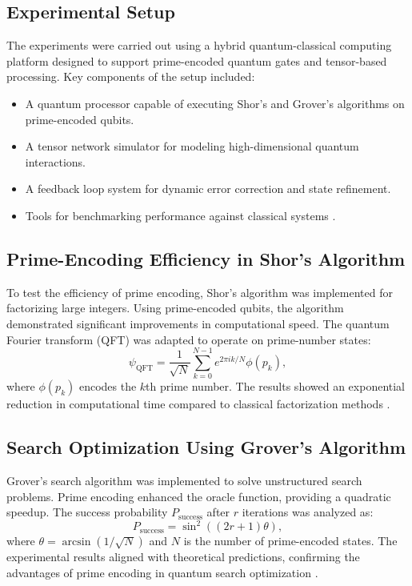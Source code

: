 \documentclass{article}
\theoremstyle{plain}
\begin{document}
\subsection{Experimental Setup}
The experiments were carried out using a hybrid quantum-classical computing platform designed to support prime-encoded quantum gates and tensor-based processing. Key components of the setup included:
\begin{itemize}
    \item A quantum processor capable of executing Shor’s and Grover’s algorithms on prime-encoded qubits.
    \item A tensor network simulator for modeling high-dimensional quantum interactions.
    \item A feedback loop system for dynamic error correction and state refinement.
    \item Tools for benchmarking performance against classical systems \cite{preskill2018quantum, shor1999algorithms}.
\end{itemize}

\subsection{Prime-Encoding Efficiency in Shor’s Algorithm}
To test the efficiency of prime encoding, Shor’s algorithm was implemented for factorizing large integers. Using prime-encoded qubits, the algorithm demonstrated significant improvements in computational speed. The quantum Fourier transform (QFT) was adapted to operate on prime-number states:
\begin{equation}
\psi_{\text{QFT}} = \frac{1}{\sqrt{N}} \sum_{k=0}^{N-1} e^{2\pi i k/N} \phi(p_k),
\end{equation}
where $\phi(p_k)$ encodes the $k$th prime number. The results showed an exponential reduction in computational time compared to classical factorization methods \cite{shor1999algorithms}.

\subsection{Search Optimization Using Grover’s Algorithm}
Grover’s search algorithm was implemented to solve unstructured search problems. Prime encoding enhanced the oracle function, providing a quadratic speedup. The success probability $P_{\text{success}}$ after $r$ iterations was analyzed as:
\begin{equation}
P_{\text{success}} = \sin^2\left( (2r+1)\theta \right),
\end{equation}
where $\theta = \arcsin(1/\sqrt{N})$ and $N$ is the number of prime-encoded states. The experimental results aligned with theoretical predictions, confirming the advantages of prime encoding in quantum search optimization \cite{grover1996search}.
\end{document}
